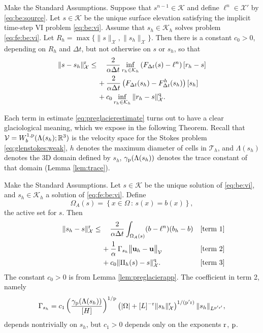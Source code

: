 \documentclass[hidelinks,onefignum,onetabnum,final]{siamart220329}  %
\newcommand{\RR}{\mathbb{R}}
\newcommand{\bu}{\mathbf{u}}
\newcommand{\cK}{\mathcal{K}}
\newcommand{\cT}{\mathcal{T}}
\newcommand{\cV}{\mathcal{V}}
\newcommand{\cX}{\mathcal{X}}
\newcommand{\pp}{{\text{\textnormal{p}}}}
\newcommand{\qq}{{\text{\textnormal{q}}}}
\newcommand{\rr}{{\text{\textnormal{r}}}}
\begin{document}
\begin{lemma} \label{lem:preglacierapp}  Make the Standard Assumptions.  Suppose that $s^{n-1}\in\cK$ and define $\ell^n \in \cX'$ by \eqref{eq:be:source}.  Let $s\in\cK$ be the unique surface elevation satisfying the implicit time-step VI problem \eqref{eq:be:vi}.  Assume that $s_h\in\cK_h$ solves problem \eqref{eq:fe:be:vi}.  Let $R_h=\max\{\|s\|_\cX,\|s_h\|_\cX\}$.  Then there is a constant $c_0>0$, depending on $R_h$ and $\Delta t$, but not otherwise on $s$ or $s_h$, so that
\begin{align}
\|s-s_h\|_\cX^\rr &\le \quad \frac{2}{\alpha \Delta t} \inf_{r_h\in\cK_h} \left(F_{\Delta t}(s)-\ell^n\right)[r_h-s] \label{eq:preglacierestimate} \\
   &\quad\, + \frac{2}{\alpha \Delta t} \left(F_{\Delta t}(s_h)-F^h_{\Delta t}(s_h)\right)[s_h] \notag \\
   &\quad\, + c_0 \inf_{r_h\in\cK_h} \|r_h - s\|_{\cX}^\qq. \notag
\end{align}
\end{lemma}

Each term in estimate \eqref{eq:preglacierestimate} turns out to have a clear glaciological meaning, which we expose in the following Theorem.  Recall that $\cV=W_b^{1,\pp}(\Lambda(s_h); \RR^3)$ is the velocity space for the Stokes problem \eqref{eq:glenstokes:weak}, $h$ denotes the maximum diameter of cells in $\cT_h$, and $\Lambda(s_h)$ denotes the 3D domain defined by $s_h$, $\gamma_\pp(\Lambda(s_h))$ denotes the trace constant of that domain (Lemma \ref{lem:trace}).

\begin{theorem} \label{thm:glacierapp}  Make the Standard Assumptions.  Let $s\in\cK$ be the unique solution of \eqref{eq:be:vi}, and $s_h\in\cK_h$ a solution of \eqref{eq:fe:be:vi}.  Define
\begin{equation}
\Omega_A(s) = \left\{x\in\Omega\,:\,s(x)=b(x)\right\},
\end{equation}
the active set for $s$.  Then
\begin{align}
\phantom{dfkljsd} \|s_h-s\|_\cX^\rr &\le \quad \frac{2}{\alpha \Delta t} \int_{\Omega_A(s)} (b - \ell^n) (b_h - b) &&\text{\textnormal{[term 1]}} \label{eq:glacierestimate} \\
   &\quad\, + \frac{1}{\alpha} \, \Gamma_{s_h} \big\|\bu_h - \bu\big\|_{\cV} &&\text{\textnormal{[term 2]}} \notag \\
   &\quad\, + c_0 \|\Pi_h(s) - s\|_\cX^\qq. &&\text{\textnormal{[term 3]}} \notag
\end{align}
The constant $c_0>0$ is from Lemma \ref{lem:preglacierapp}.  The coefficient in term 2, namely
\begin{equation}
\Gamma_{s_h} = c_1 \left(\frac{\gamma_\pp(\Lambda(s_h))}{[H]}\right)^{1/\pp} \left(|\Omega| + [L]^{-\rr}\|s_h\|_{\cX}^\rr\right)^{1/(\pp'\rr)} \|s_h\|_{L^{\pp'\rr'}},
\end{equation}
depends nontrivially on $s_h$, but $c_1>0$ depends only on the exponents $\rr$, $\pp$.
\end{theorem}
\end{document}
